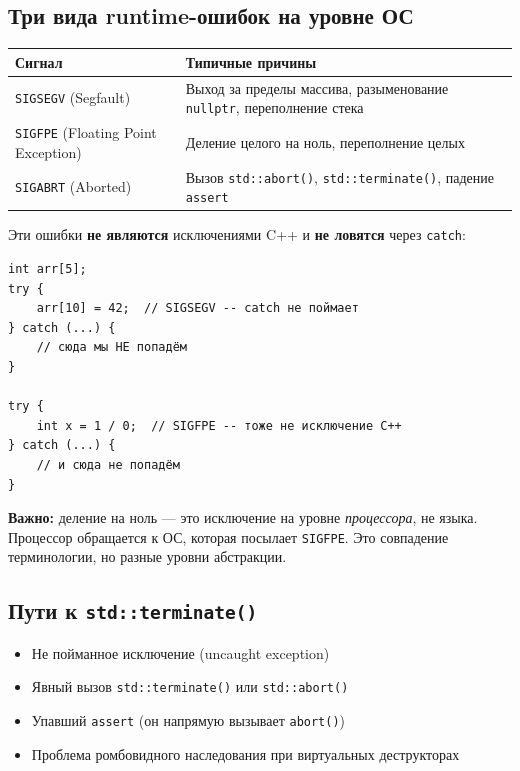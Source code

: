 \documentclass[a4paper,12pt]{article}
\begin{document}
\subsection{Три вида runtime-ошибок на уровне ОС}

\begin{center}
\begin{tabular}{lp{9cm}}
\toprule
\textbf{Сигнал} & \textbf{Типичные причины} \\
\midrule
\texttt{SIGSEGV} (Segfault)
    & Выход за пределы массива, разыменование \texttt{nullptr},
      переполнение стека \\
\addlinespace
\texttt{SIGFPE} (Floating Point Exception)
    & Деление целого на ноль, переполнение целых \\
\addlinespace
\texttt{SIGABRT} (Aborted)
    & Вызов \texttt{std::abort()}, \texttt{std::terminate()},
      падение \texttt{assert} \\
\bottomrule
\end{tabular}
\end{center}

\medskip
Эти ошибки \textbf{не являются} исключениями C++ и \textbf{не ловятся}
через \texttt{catch}:

\begin{lstlisting}
int arr[5];
try {
    arr[10] = 42;  // SIGSEGV -- catch не поймает
} catch (...) {
    // сюда мы НЕ попадём
}

try {
    int x = 1 / 0;  // SIGFPE -- тоже не исключение C++
} catch (...) {
    // и сюда не попадём
}
\end{lstlisting}

\textbf{Важно:} деление на ноль --- это исключение на уровне
\textit{процессора}, не языка. Процессор обращается к ОС, которая
посылает \texttt{SIGFPE}. Это совпадение терминологии, но разные
уровни абстракции.

\subsection{Пути к \texttt{std::terminate()}}

\begin{itemize}
    \item Не пойманное исключение (uncaught exception)
    \item Явный вызов \texttt{std::terminate()} или \texttt{std::abort()}
    \item Упавший \texttt{assert} (он напрямую вызывает \texttt{abort()})
    \item Проблема ромбовидного наследования при виртуальных деструкторах
\end{itemize}
\end{document}
